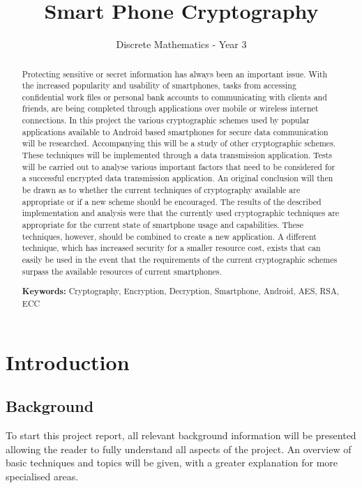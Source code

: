 \documentclass[a4paper,10pt]{report}
\title{\Huge Smart Phone Cryptography}
\author{Discrete Mathematics - Year 3}
\begin{document}
\maketitle

\begin{abstract}

Protecting sensitive or secret information has always been an important issue. With the increased popularity and usability of smartphones, tasks from accessing confidential work files or personal bank accounts to communicating with clients and friends, are being completed through applications over mobile or wireless internet connections. In this project the various cryptographic schemes used by popular applications available to Android based smartphones for secure data communication will be researched. Accompanying this will be a study of other cryptographic schemes. These techniques will be implemented through a data transmission application. Tests will be carried out to analyse various important factors that need to be considered for a successful encrypted data transmission application. An original conclusion will then be drawn as to whether the current techniques of cryptography available are appropriate or if a new scheme should be encouraged. The results of the described implementation and analysis were that the currently used cryptographic techniques are appropriate for the current state of smartphone usage and capabilities. These techniques, however, should be combined to create a new application. A different technique, which has increased security for a smaller resource cost, exists that can easily be used in the event that the requirements of the current cryptographic schemes surpass the available resources of current smartphones. 

{\bf Keywords:} Cryptography, Encryption, Decryption, Smartphone, Android, AES, RSA, ECC
\end{abstract}

\tableofcontents


\chapter{Introduction}


\section{Background}

To start this project report, all relevant background information will be presented allowing the reader to fully understand all aspects of the project. An overview of basic techniques and topics will be given, with a greater explanation for more specialised areas. 
\end{document}
